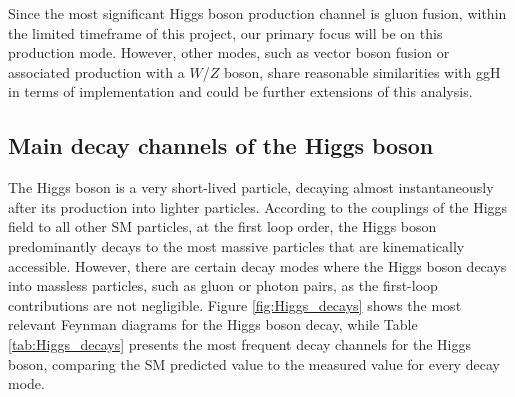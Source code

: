 Since the most significant Higgs boson production channel is gluon fusion, within the limited timeframe of this project, our primary focus will be on this production mode. However, other modes, such as vector boson fusion or associated production with a $W$/$Z$ boson, share reasonable similarities with ggH in terms of implementation and could be further extensions of this analysis.

\subsection{Main decay channels of the Higgs boson}

The Higgs boson is a very short-lived particle, decaying almost instantaneously after its production into lighter particles. According to the couplings of the Higgs field to all other SM particles, at the first loop order, the Higgs boson predominantly decays to the most massive particles that are kinematically accessible. However, there are certain decay modes where the Higgs boson decays into massless particles, such as gluon or photon pairs, as the first-loop contributions are not negligible. Figure \ref{fig:Higgs_decays} shows the most relevant Feynman diagrams for the Higgs boson decay, while Table \ref{tab:Higgs_decays} presents the most frequent decay channels for the Higgs boson, comparing the SM predicted value to the measured value for every decay mode.

